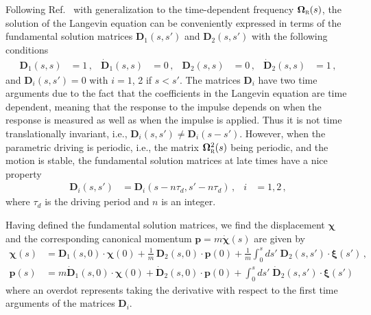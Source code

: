 \documentclass[11pt,a4paper]{article}
\begin{document}
Following Ref.~\cite{HH15AOP} with generalization to the time-dependent frequency $\bm{\Omega}_{\textsc{r}}(s)$, the solution of the Langevin equation can be conveniently expressed in terms of the fundamental solution matrices $\bm{D}_1 (s,s')$ and $\bm{D}_2 (s,s')$ with the following conditions
\begin{align}
	\bm{D}_1 (s,s) &=1\,, &\dot{\bm{D}}_1 (s,s)&=0\,, &\bm{D}_2 (s,s) &= 0\,, &\dot{\bm{D}}_2 (s,s) &= 1\,,\label{d2-init}
\end{align}
and $\bm{D}_{i}(s,s')=0$ with $i=1$, 2 if $s<s'$. The matrices $\bm{D}_{i}$ have two time arguments due to the fact that the coefficients in the Langevin equation are time dependent, meaning that the response to the impulse depends on when the response is measured as well as when the impulse is applied. Thus it is not time translationally invariant, i.e., $\bm{D}_i(s,s')\neq\bm{D}_i(s-s')$. However, when the parametric driving is periodic, i.e., the matrix $\bm{\Omega}^2_{\textsc{r}}(s)$ being periodic, and the motion is stable, the fundamental solution matrices at late times have a nice property~\cite{paz-cool1}
\begin{align}\label{E:dkjgbfkse}
	\bm{D}_{i}(s,s') &= \bm{D}_{i} (s - n \tau_d, s' - n \tau_d)\,, &i&=1,2\,,
\end{align}
where $\tau_d$ is the driving period and $n$ is an integer.

Having defined the fundamental solution matrices, we find the displacement $\bm{\chi}$ and the corresponding canonical momentum $\bm{p}= m \dot{\bm{\chi}}(s) $ are given by
\begin{align}
	\bm{\chi}(s) &= \bm{D}_1 (s,0) \cdot \bm{\chi}(0) + \frac{1}{m}\,\bm{D}_2 (s,0) \cdot \bm{p}(0) + \frac{1}{m} \int_0^s ds'\; \bm{D}_2 (s,s') \cdot \bm{\xi}(s')\,, \label{chi} \\
	\bm{p}(s) &= m\dot{\bm{D}}_1 (s,0) \cdot \bm{\chi}(0) +\dot{\bm{D}}_2 (s,0) \cdot \bm{p}(0) +  \int_0^s ds' \;\dot{\bm{D}}_2 (s,s') \cdot \bm{\xi}(s')  \label{p}
\end{align}
where an overdot represents taking the derivative with respect to the first time arguments of the matrices $\bm{D}_i$.
\end{document}
